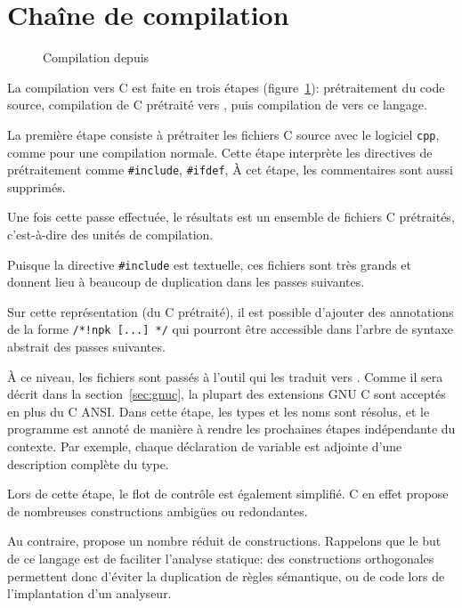 \section{Chaîne de compilation}
\label{sec:compil}

\begin{figure}
  \centering
  
  \caption{Compilation depuis \newspeak}
\label{fig:compil-npk}
\end{figure}

La compilation vers C est faite en trois étapes (figure~\ref{fig:compil-npk}):
prétraitement du code source, compilation de C prétraité vers \newspeak{}, puis
compilation de \newspeak{} vers ce langage.

La première étape consiste à prétraiter les fichiers C source avec le logiciel
\texttt{cpp}, comme pour une compilation normale. Cette étape interprète les
directives de prétraitement comme \texttt{\#include}, \texttt{\#ifdef}, À cet
étape, les commentaires sont aussi supprimés.

Une fois cette passe effectuée, le résultats est un ensemble de fichiers C
prétraités, c'est-à-dire des unités de compilation.

Puisque la directive \texttt{\#include} est textuelle, ces fichiers sont très
grands et donnent lieu à beaucoup de duplication dans les passes suivantes.

Sur cette représentation (du C prétraité), il est possible d'ajouter des
annotations de la forme \texttt{/*!npk [...] */} qui pourront être accessible
dans l'arbre de syntaxe abstrait des passes suivantes.

À ce niveau, les fichiers sont passés à l'outil \ctonewspeak qui les
traduit vers \newspeak. Comme il sera décrit dans la section~\ref{sec:gnuc}, la
plupart des extensions GNU C sont acceptés en plus du C ANSI. Dans cette étape,
les types et les noms sont résolus, et le programme est annoté de manière à
rendre les prochaines étapes indépendante du contexte. Par exemple, chaque
déclaration de variable est adjointe d'une description complète du type.

Lors de cette étape, le flot de contrôle est également simplifié. C en effet
propose de nombreuses constructions ambigües ou redondantes.

Au contraire, \newspeak propose un nombre réduit de constructions. Rappelons que
le but de ce langage est de faciliter l'analyse statique: des constructions
orthogonales permettent donc d'éviter la duplication de règles sémantique, ou de
code lors de l'implantation d'un analyseur.

